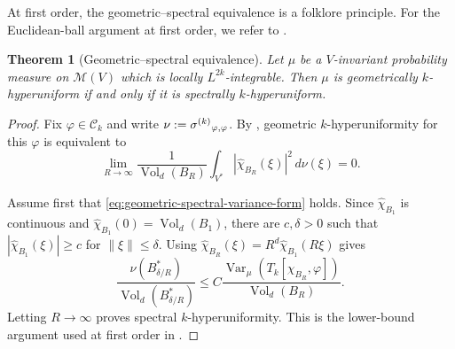 \documentclass[11pt,reqno,a4paper]{amsart}
\numberwithin{equation}{section}
\theoremstyle{compact}
\newtheorem{theorem}{Theorem}[section]
\theoremstyle{definition}
\theoremstyle{definition}
\newcommand{\Var}{\operatorname{Var}}
\newcommand{\Vol}{\operatorname{Vol}}
\newcommand{\cM}{\mathcal M}
\newcommand{\sigmak}{\smash[t]{\sigma^{(k)}}}
\begin{document}
At first order, the geometric--spectral equivalence is a folklore
principle.  For the Euclidean-ball argument at first order, we refer to
\cite[Theorem~3.6(i),(iii)]{BH24}.

\begin{theorem}[Geometric--spectral equivalence]\label{thm:geometric-spectral}
Let $\mu$ be a $V$-invariant probability measure on $\cM(V)$ which is
locally $L^{2k}$-integrable.  Then $\mu$ is geometrically $k$-hyperuniform
if and only if it is spectrally $k$-hyperuniform.
\end{theorem}

\begin{proof}
Fix $\varphi\in\mathcal C_k$ and write
$\nu:=\sigmak_{\varphi,\varphi}$.  By
, geometric $k$-hyperuniformity for this $\varphi$ is equivalent to
\begin{equation}\label{eq:geometric-spectral-variance-form}
  \lim_{R\to\infty}
  \frac{1}{\Vol_d(B_R)}
  \int_{V^*}|\widehat\chi_{B_R}(\xi)|^2\,d\nu(\xi)=0.
\end{equation}

Assume first that \eqref{eq:geometric-spectral-variance-form} holds.  Since
$\widehat\chi_{B_1}$ is continuous and
$\widehat\chi_{B_1}(0)=\Vol_d(B_1)$, there are $c,\delta>0$ such that
$|\widehat\chi_{B_1}(\xi)|\geq c$ for $\|\xi\|\leq\delta$.  Using
$\widehat\chi_{B_R}(\xi)=R^d\widehat\chi_{B_1}(R\xi)$ gives
\begin{equation}\label{eq:geometric-implies-spectral-estimate}
  \frac{\nu(B_{\delta/R}^*)}{\Vol_d(B_{\delta/R}^*)}
  \leq C
  \frac{\Var_\mu(T_k[\chi_{B_R},\varphi])}{\Vol_d(B_R)}.
\end{equation}
Letting $R\to\infty$ proves spectral $k$-hyperuniformity.  This is the
lower-bound argument used at first order in
\cite[Theorem~3.6(i)]{BH24}.


\end{proof}
\end{document}
